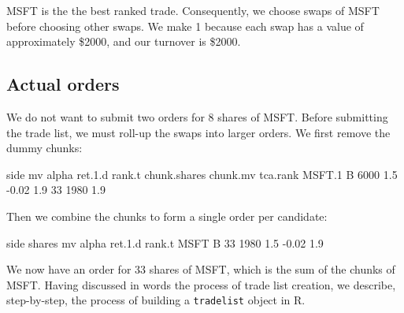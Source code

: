 \documentclass{article}
\begin{document}
MSFT is the the best ranked trade.  Consequently, we choose swaps of
MSFT before choosing other swaps.  We make
1 because each swap has a value of
approximately \$2000, and our turnover is
\$2000.

\subsection{Actual orders}

We do not want to submit two orders for 8 shares of MSFT.  Before
submitting the trade list, we must roll-up the swaps into larger
orders.  We first remove the dummy chunks:

\begin{Schunk}
\begin{Soutput}
       side   mv alpha ret.1.d rank.t chunk.shares chunk.mv tca.rank
MSFT.1    B 6000   1.5   -0.02    1.9           33     1980      1.9
\end{Soutput}
\end{Schunk}

Then we combine the chunks to form a single order per candidate:

\begin{Schunk}
\begin{Soutput}
     side shares   mv alpha ret.1.d rank.t
MSFT    B     33 1980   1.5   -0.02    1.9
\end{Soutput}
\end{Schunk}

We now have an order for 33 shares of
MSFT, which is the sum of the chunks of
MSFT.  Having discussed in words the process of
trade list creation, we describe, step-by-step, the process of
building a \texttt{tradelist} object in R.





\end{document}
